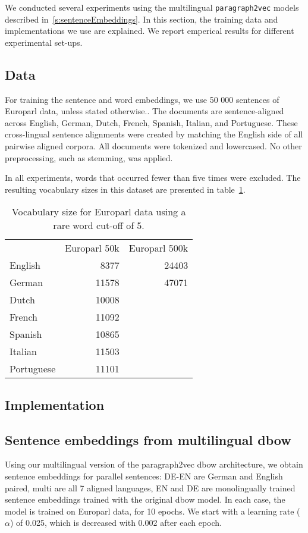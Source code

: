 
We conducted several experiments using the multilingual \texttt{paragraph2vec} models described in~\ref{s:sentenceEmbeddings}. In this section, the training data and implementations we use are explained. We report emperical results for different experimental set-ups.



\subsection{Data}
For training the sentence and word embeddings, we use 50 000 sentences of Europarl data, unless stated otherwise.. 
The documents are sentence-aligned across English, German, Dutch, French, Spanish, Italian, and Portuguese. These cross-lingual sentence alignments were created by matching the English side of all pairwise aligned corpora.
All documents were tokenized and lowercased. No other preprocessing, such as stemming, was applied.

In all experiments, words that occurred fewer than five times were excluded.
The resulting vocabulary sizes in this dataset are presented  in table~\ref{t:vocabularies}.

\begin{table}
\center
\begin{tabular}{l r r}
		&Europarl 50k 	&Europarl 500k\\
English	&8377			&24403	\\	
German	&11578		&47071	\\
Dutch		&10008				\\
French	&11092				\\	
Spanish	&10865				\\
Italian		&11503				\\
Portuguese	&11101				\\
\end{tabular}
\caption{Vocabulary size for Europarl data using a rare word cut-off of 5.}
\label{t:vocabularies}
\end{table}

\subsection{Implementation}


\subsection{Sentence embeddings from multilingual dbow}
Using our multilingual version of the paragraph2vec dbow architecture, we obtain sentence embeddings for parallel sentences: DE-EN are German and English paired, multi are all 7 aligned languages, EN and DE are monolingually trained sentence embeddings trained with the original dbow model. In each case, the model is trained on Europarl data, for 10 epochs. We start with a learning rate ($\alpha$) of 0.025, which is decreased with 0.002 after each epoch.

